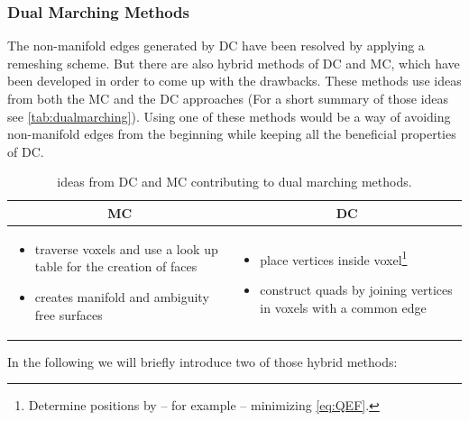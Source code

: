 \subsubsection{Dual Marching Methods}
The non-manifold edges generated by \ac{DC} have been resolved by applying a remeshing scheme. But there are also hybrid methods of \ac{DC} and \ac{MC}, which have been developed in order to come up with the drawbacks. These methods use ideas from both the \ac{MC} and the \ac{DC} approaches (For a short summary of those ideas see \autoref{tab:dualmarching}). Using one of these methods would be a way of avoiding non-manifold edges from the beginning while keeping all the beneficial properties of \ac{DC}. 
\begin{table}[H]
\begin{tabularx}{\textwidth}{X|X}
\multicolumn{1}{c|}{\acl{MC}} 
    & \multicolumn{1}{c}{\acl{DC}} 
\\
\hline
\begin{itemize}[ topsep = 0pt, leftmargin=1em]
\item traverse voxels and use a look up table for the creation of faces
\item creates manifold and ambiguity free surfaces
\end{itemize}
&
\begin{itemize}[ topsep = 0pt, leftmargin=1em]
\item place vertices inside voxel\footnote{Determine positions by -- for example -- minimizing \autoref{eq:QEF}.}
\item construct \acp{quad} by joining vertices in voxels with a common edge
\end{itemize}
\end{tabularx}
\caption{ideas from \ac{DC} and \ac{MC} contributing to dual marching methods.}
\label{tab:dualmarching}
\end{table}
In the following we will briefly introduce two of those hybrid methods:

